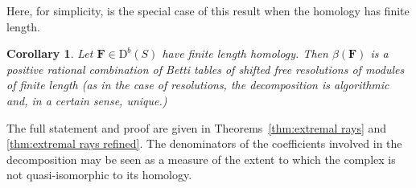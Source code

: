 \documentclass[12pt]{amsart}
\newtheorem{cor}[lemma]{Corollary}
\theoremstyle{definition}
\theoremstyle{remark}
\newcommand{\codim}{\operatorname{codim}}
\newcommand{\FF}{\mathbf{F}}
\newcommand{\DD}{\mathrm{D}}
\begin{document}
Here, for simplicity, is the special case of this result when the homology has finite length. 
%
\begin{cor}\label{cor:decompose}
Let $\FF\in \DD^b(S)$ have finite length homology.  Then $\beta(\FF)$ is a positive rational combination of Betti tables of shifted free resolutions of modules of finite length (as in the case of resolutions, the decomposition is algorithmic and, in a certain sense, unique.)
\end{cor}

The full statement and proof are given in Theorems~\ref{thm:extremal rays} and \ref{thm:extremal rays refined}.  
The denominators of the coefficients involved in the decomposition may be seen as a measure of the extent to which the complex is not quasi-isomorphic to its homology. 
\end{document}
